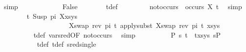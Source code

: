 \begin{isabellebody}
\ simp\isanewline
\ \ \ \ \isamarkupfalse%
\isanewline
\ \ \ \ \ \ \isamarkupfalse%
\ False\isanewline
\ \ \ \ \ \ \isamarkupfalse%
\ t{}{\isacharunderscore}{\kern0pt}def\ \isanewline
\ \ \ \ \ \ \isamarkupfalse%
\ not{\isacharunderscore}{\kern0pt}occurs{\isacharcolon}{\kern0pt}\ {\isachardoublequoteopen}{\isasymnot}\ occurs\ X\ t{}{\isachardoublequoteclose}\ \isamarkupfalse%
\ simp\isanewline
\ \ \ \ \ \ \isamarkupfalse%
\ {\isachardoublequoteopen}{\isacharparenleft}{\kern0pt}{\isacharparenleft}{\kern0pt}t{}{\isasymapprox}{\isacharquery}{\kern0pt}\ Susp\ pi\ X{\isacharparenright}{\kern0pt}{\isacharhash}{\kern0pt}xs{\isacharcomma}{\kern0pt}ys{\isacharparenright}{\kern0pt}\ \isanewline
\ \ \ \ \ \ \ \ \ \ \ \ \ \ \ \ \ \ \ \ {\isasymturnstile}{\isacharbrackleft}{\kern0pt}{\isacharparenleft}{\kern0pt}X{\isacharcomma}{\kern0pt}swap\ {\isacharparenleft}{\kern0pt}rev\ pi{\isacharparenright}{\kern0pt}\ t{}{\isacharparenright}{\kern0pt}{\isacharbrackright}{\kern0pt}{\isasymleadsto}\ apply{\isacharunderscore}{\kern0pt}subst\ {\isacharbrackleft}{\kern0pt}{\isacharparenleft}{\kern0pt}X{\isacharcomma}{\kern0pt}swap\ {\isacharparenleft}{\kern0pt}rev\ pi{\isacharparenright}{\kern0pt}\ t{}{\isacharparenright}{\kern0pt}{\isacharbrackright}{\kern0pt}\ {\isacharparenleft}{\kern0pt}xs{\isacharcomma}{\kern0pt}ys{\isacharparenright}{\kern0pt}{\isachardoublequoteclose}\isanewline
\ \ \ \ \ \ \ \ \isamarkupfalse%
\ t{}{\isacharunderscore}{\kern0pt}def\ var{\isacharunderscore}{\kern0pt}{}{\isacharunderscore}{\kern0pt}sred{\isacharbrackleft}{\kern0pt}OF\ not{\isacharunderscore}{\kern0pt}occurs{\isacharbrackright}{\kern0pt}\ \isamarkupfalse%
\ simp\isanewline
\ \ \ \ \ \ \ \isamarkupfalse%
\ {\isachardoublequoteopen}{\isasymexists}\ P{}\ s{\isachardot}{\kern0pt}\ {\isacharparenleft}{\kern0pt}{\isacharparenleft}{\kern0pt}t{}\ {\isasymapprox}{\isacharquery}{\kern0pt}\ t{}{\isacharparenright}{\kern0pt}{\isacharhash}{\kern0pt}xs{\isacharcomma}{\kern0pt}ys{\isacharparenright}{\kern0pt}\ {\isasymTurnstile}{\isacharparenleft}{\kern0pt}{\isacharbraceleft}{\kern0pt}{\isacharbraceright}{\kern0pt}{\isacharcomma}{\kern0pt}s{\isacharparenright}{\kern0pt}{\isasymRightarrow}P{}{\isachardoublequoteclose}\isanewline
\ \ \ \ \ \ \ \ \ \isamarkupfalse%
\ t{}{\isacharunderscore}{\kern0pt}def\ t{}{\isacharunderscore}{\kern0pt}def\ sred{\isacharunderscore}{\kern0pt}single\ \isamarkupfalse%

\end{isabellebody}
